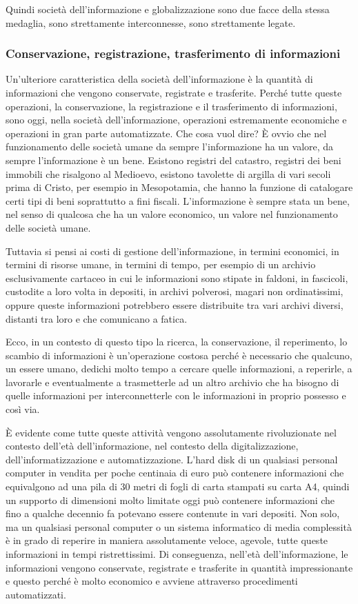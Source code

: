 Quindi società dell'informazione e globalizzazione sono due facce della stessa medaglia, sono strettamente interconnesse, sono strettamente legate.

\subsubsection*{Conservazione, registrazione, trasferimento di informazioni}
Un'ulteriore caratteristica della società dell'informazione è la quantità di informazioni che vengono conservate, registrate e trasferite. Perché tutte queste operazioni, la conservazione, la registrazione e il trasferimento di informazioni, sono oggi, nella società dell'informazione, operazioni estremamente economiche e operazioni in gran parte automatizzate. Che cosa vuol dire? È ovvio che nel funzionamento delle società umane da sempre l'informazione ha un valore, da sempre l'informazione è un bene. Esistono registri del catastro, registri dei beni immobili che risalgono al Medioevo, esistono tavolette di argilla di vari secoli prima di Cristo, per esempio in Mesopotamia, che hanno la funzione di catalogare certi tipi di beni soprattutto a fini fiscali. L'informazione è sempre stata un bene, nel senso di qualcosa che ha un valore economico, un valore nel funzionamento delle società umane. 

Tuttavia si pensi ai costi di gestione dell'informazione, in termini economici, in termini di risorse umane, in termini di tempo, per esempio di un archivio esclusivamente cartaceo in cui le informazioni sono stipate in faldoni, in fascicoli, custodite a loro volta in depositi, in archivi polverosi, magari non ordinatissimi, oppure queste informazioni potrebbero essere distribuite tra vari archivi diversi, distanti tra loro e che comunicano a fatica. 

Ecco, in un contesto di questo tipo la ricerca, la conservazione, il reperimento, lo scambio di informazioni è un'operazione costosa perché è necessario che qualcuno, un essere umano, dedichi molto tempo a cercare quelle informazioni, a reperirle, a lavorarle e eventualmente a trasmetterle ad un altro archivio che ha bisogno di quelle informazioni per interconnetterle con le informazioni in proprio possesso e così via. 

È evidente come tutte queste attività vengono assolutamente rivoluzionate nel contesto dell'età dell'informazione, nel contesto della digitalizzazione, dell'informatizzazione e automatizzazione. L'hard disk di un qualsiasi personal computer in vendita per poche centinaia di euro può contenere informazioni che equivalgono ad una pila di 30 metri di fogli di carta stampati su carta A4, quindi un supporto di dimensioni molto limitate oggi può contenere informazioni che fino a qualche decennio fa potevano essere contenute in vari depositi. Non solo, ma un qualsiasi personal computer o un sistema informatico di media complessità è in grado di reperire in maniera assolutamente veloce, agevole, tutte queste informazioni in tempi ristrettissimi. Di conseguenza, nell'età dell'informazione, le informazioni vengono conservate, registrate e trasferite in quantità impressionante e questo perché è molto economico e avviene attraverso procedimenti automatizzati.

